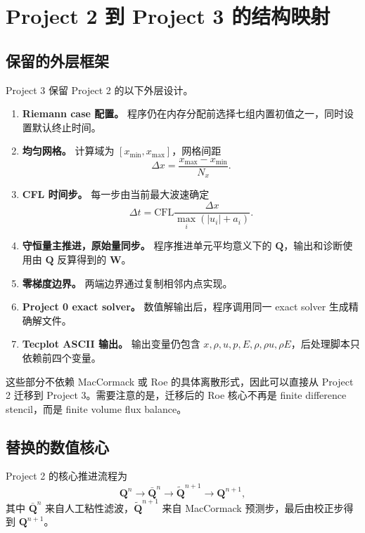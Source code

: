 \section{Project 2 到 Project 3 的结构映射}

\subsection{保留的外层框架}

Project 3 保留 Project 2 的以下外层设计。

\begin{enumerate}[leftmargin=2em]
    \item \textbf{Riemann case 配置。} 程序仍在内存分配前选择七组内置初值之一，同时设置默认终止时间。
    \item \textbf{均匀网格。} 计算域为 \([x_{\min},x_{\max}]\)，网格间距
    \[
        \Delta x=\frac{x_{\max}-x_{\min}}{N_x}.
    \]
    \item \textbf{CFL 时间步。} 每一步由当前最大波速确定
    \[
        \Delta t
        =
        \mathrm{CFL}
        \frac{\Delta x}{\max_i(|u_i|+a_i)}.
    \]
    \item \textbf{守恒量主推进，原始量同步。} 程序推进单元平均意义下的 \(\bm Q\)，输出和诊断使用由 \(\bm Q\) 反算得到的 \(\bm W\)。
    \item \textbf{零梯度边界。} 两端边界通过复制相邻内点实现。
    \item \textbf{Project 0 exact solver。} 数值解输出后，程序调用同一 exact solver 生成精确解文件。
    \item \textbf{Tecplot ASCII 输出。} 输出变量仍包含 \(x,\rho,u,p,E,\rho,\rho u,\rho E\)，后处理脚本只依赖前四个变量。
\end{enumerate}

这些部分不依赖 MacCormack 或 Roe 的具体离散形式，因此可以直接从 Project 2 迁移到 Project 3。需要注意的是，迁移后的 Roe 核心不再是 finite difference stencil，而是 finite volume flux balance。

\subsection{替换的数值核心}

Project 2 的核心推进流程为
\begin{equation}
    \bm Q^n
    \longrightarrow
    \bar{\bm Q}^n
    \longrightarrow
    \widetilde{\bm Q}^{n+1}
    \longrightarrow
    \bm Q^{n+1},
\end{equation}
其中 \(\bar{\bm Q}^n\) 来自人工粘性滤波，\(\widetilde{\bm Q}^{n+1}\) 来自 MacCormack 预测步，最后由校正步得到 \(\bm Q^{n+1}\)。

